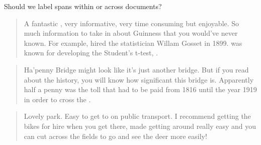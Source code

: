 

\begin{frame}{Should we label spans within or across documents?}
\scriptsize
   \begin{quote}
       A fantastic , very informative, very
       time consuming but enjoyable. So much information to take in about
       Guinness that you would’ve never known. For example,
        hired the statistician Willam
       Gosset in 1899.  was known for developing the Student’s t-test,
       .
   \end{quote}
   \begin{quote}
       Ha’penny Bridge might look like it’s just another bridge. But if you
       read about the history, you will know how significant this bridge
       is. Apparently half a penny was the toll that had to be paid from
       1816 until the year 1919 in order to cross the
       .
   \end{quote}
   \begin{quote}
       Lovely park. Easy to get to on public transport. I recommend getting
       the bikes for hire when you get there,  made getting around really easy and you can cut across the fields to go and see the deer more easily!
   \end{quote}
   \centering
   \normalsize
   \vfill

\end{frame}

